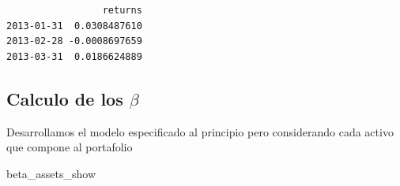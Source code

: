 \documentclass[
  letterpaper,
  DIV=11,
  numbers=noendperiod]{scrartcl}
\newenvironment{Shaded}{\begin{snugshade}}{\end{snugshade}}
\newcommand{\AttributeTok}[1]{\textcolor[rgb]{0.40,0.45,0.13}{#1}}
\newcommand{\DecValTok}[1]{\textcolor[rgb]{0.68,0.00,0.00}{#1}}
\newcommand{\FunctionTok}[1]{\textcolor[rgb]{0.28,0.35,0.67}{#1}}
\newcommand{\NormalTok}[1]{\textcolor[rgb]{0.00,0.23,0.31}{#1}}
\newcommand{\OtherTok}[1]{\textcolor[rgb]{0.00,0.23,0.31}{#1}}
\newcommand{\SpecialCharTok}[1]{\textcolor[rgb]{0.37,0.37,0.37}{#1}}
\begin{document}
\begin{verbatim}
                 returns
2013-01-31  0.0308487610
2013-02-28 -0.0008697659
2013-03-31  0.0186624889
\end{verbatim}

\subsection{\texorpdfstring{Calculo de los
\(\beta\)}{Calculo de los \textbackslash beta}}\label{calculo-de-los-beta}

Desarrollamos el modelo especificado al principio pero considerando cada
activo que compone al portafolio

\begin{Shaded}
\end{Shaded}

\begin{Shaded}
\begin{Highlighting}[]
\NormalTok{beta\_assets\_show}
\end{Highlighting}
\end{Shaded}
\end{document}
